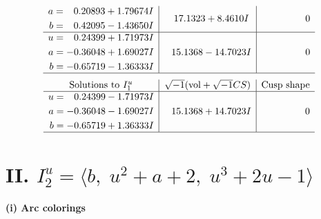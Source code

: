 \documentclass[1p]{elsarticle_modified}
\theoremstyle{definition}
\newcommand{\I}{\sqrt{-1}}
\begin{document}
$$\begin{array}{c|c|c}
\begin{aligned}
a &= \phantom{-}0.20893 + 1.79674 I \\
b &= \phantom{-}0.42095 - 1.43650 I\end{aligned}
 & \phantom{-}17.1323 + 8.4610 I & \phantom{-0.000000 } 0 \\ \hline\begin{aligned}
u &= \phantom{-}0.24399 + 1.71973 I \\
a &= -0.36048 + 1.69027 I \\
b &= -0.65719 - 1.36333 I\end{aligned}
 & \phantom{-}15.1368 - 14.7023 I & \phantom{-0.000000 } 0\\
 \hline 
 \end{array}$$\newpage$$\begin{array}{c|c|c}  
\text{Solutions to }I^u_{1}& \I (\text{vol} + \sqrt{-1}CS) & \text{Cusp shape}\\
 \hline 
\begin{aligned}
u &= \phantom{-}0.24399 - 1.71973 I \\
a &= -0.36048 - 1.69027 I \\
b &= -0.65719 + 1.36333 I\end{aligned}
 & \phantom{-}15.1368 + 14.7023 I & \phantom{-0.000000 } 0\\
 \hline 
 \end{array}$$\newpage\newpage\renewcommand{\arraystretch}{1}
\centering \section*{II. $I^u_{2}= \langle b,\;u^2+a+2,\;u^3+2 u-1 \rangle$}
\flushleft \textbf{(i) Arc colorings}\\
\end{document}
